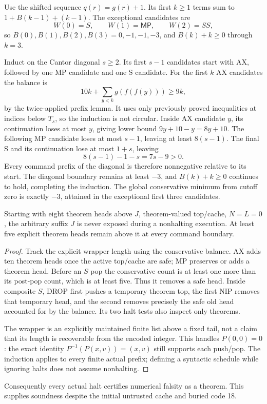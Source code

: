 Use the shifted sequence $q(r)=g(r)+1$. Its first $k\ge1$ terms sum to $1+B(k-1)+(k-1)$. The exceptional candidates are
\[
                         W(0)=S,\qquad W(1)=\mathsf{MP},\qquad W(2)=SS,
\]
so $B(0),B(1),B(2),B(3)=0,-1,-1,-3$, and $B(k)+k\ge0$ through $k=3$.

Induct on the Cantor diagonal $s\ge2$. Its first $s-1$ candidates start with AX, followed by one MP candidate and one S candidate. For the first $k$ AX candidates the balance is
\[
10k+\sum_{y<k}g(f(f(y)))\ge9k,
\]
by the twice-applied prefix lemma. It uses only previously proved inequalities at indices below $T_s$, so the induction is not circular. Inside AX candidate $y$, its continuation loses at most $y$, giving lower bound $9y+10-y=8y+10$. The following MP candidate loses at most $s-1$, leaving at least $8(s-1)$. The final S and its continuation lose at most $1+s$, leaving
\[
                              8(s-1)-1-s=7s-9>0.
\]
Every command prefix of the diagonal is therefore nonnegative relative to its start. The diagonal boundary remains at least $-3$, and $B(k)+k\ge0$ continues to hold, completing the induction. The global conservative minimum from cutoff zero is exactly $-3$, attained in the exceptional first three candidates.

\begin{lemma}
Starting with eight theorem heads above $J$, theorem-valued top/cache, $N=L=0$, the arbitrary suffix $J$ is never exposed during a nonhalting execution. At least five explicit theorem heads remain above it at every command boundary.
\end{lemma}
\begin{proof}
Track the explicit wrapper length using the conservative balance. AX adds ten theorem heads once the active top/cache are safe; MP preserves or adds a theorem head. Before an $S$ pop the conservative count is at least one more than its post-pop count, which is at least five. Thus it removes a safe head. Inside composite $S$, DROP first pushes a temporary theorem top, the first NIP removes that temporary head, and the second removes precisely the safe old head accounted for by the balance. Its two halt tests also inspect only theorems.

The wrapper is an explicitly maintained finite list above a fixed tail, not a claim that its length is recoverable from the encoded integer. This handles $P(0,0)=0$: the exact identity $P^{-1}(P(x,v))=(x,v)$ still supports each push/pop. The induction applies to every finite actual prefix; defining a syntactic schedule while ignoring halts does not assume nonhalting.
\end{proof}
Consequently every actual halt certifies numerical falsity as a theorem. This supplies soundness despite the initial untrusted cache and buried code 18.

